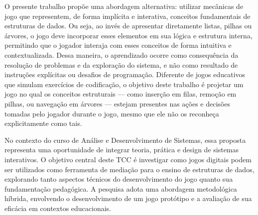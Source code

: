 O presente trabalho propõe uma abordagem alternativa: utilizar mecânicas de jogo que representem, de forma implícita e interativa, conceitos fundamentais de estruturas de dados. Ou seja, ao invés de apresentar diretamente listas, pilhas ou árvores, o jogo deve incorporar esses elementos em sua lógica e estrutura interna, permitindo que o jogador interaja com esses conceitos de forma intuitiva e contextualizada. Dessa maneira, o aprendizado ocorre como consequência da resolução de problemas e da exploração do sistema, e não como resultado de instruções explícitas ou desafios de programação. Diferente de jogos educativos que simulam exercícios de codificação, o objetivo deste trabalho é projetar um jogo no qual os conceitos estruturais — como inserção em filas, remoção em pilhas, ou navegação em árvores — estejam presentes nas ações e decisões tomadas pelo jogador durante o jogo, mesmo que ele não os reconheça explicitamente como tais.

No contexto do curso de Análise e Desenvolvimento de Sistemas, essa proposta representa uma oportunidade de integrar teoria, prática e design de sistemas interativos. O objetivo central deste TCC é investigar como jogos digitais podem ser utilizados como ferramenta de mediação para o ensino de estruturas de dados, explorando tanto aspectos técnicos do desenvolvimento do jogo quanto sua fundamentação pedagógica. A pesquisa adota uma abordagem metodológica híbrida, envolvendo o desenvolvimento de um jogo protótipo e a avaliação de sua eficácia em contextos educacionais.
